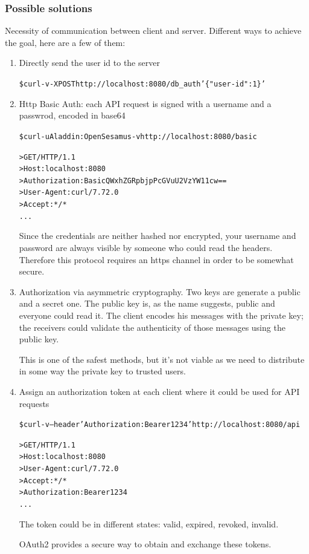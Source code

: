 \documentclass{style}
\begin{document}
\subsubsection{Possible solutions}
Necessity of communication between client and server.
Different ways to achieve the goal, here are a few of them:
\begin{enumerate}
    \item Directly send the user id to the server
    \begin{alltt}
\$ curl -v -X POST http://localhost:8080/db_auth '\{"user-id": 1\}'
    \end{alltt}

    \item Http Basic Auth: each API request is signed with a username and a passwrod, encoded in base64
    \begin{alltt}
\$ curl -u Aladdin:OpenSesamus -v http://localhost:8080/basic

> GET / HTTP/1.1
> Host: localhost:8080
> Authorization: Basic QWxhZGRpbjpPcGVuU2VzYW11cw==
> User-Agent: curl/7.72.0
> Accept: */*
...
    \end{alltt}
    Since the credentials are neither hashed nor encrypted, your username and password are always visible by
    someone who could read the headers.
    Therefore this protocol requires an https channel in order to be somewhat secure.

    \item Authorization via asymmetric cryptography. Two keys are generate a public and a secret one.
        The public key is, as the name suggests, public and everyone could read it.
        The client encodes his messages with the private key; the receivers could validate the authenticity of
        those messages using the public key.

        This is one of the safest methods, but it's not viable as we need to distribute in some way the private key to
        trusted users.

    \item Assign an authorization token at each client where it could be used for API requests
    \begin{alltt}
\$ curl -v --header 'Authorization: Bearer 1234' http://localhost:8080/api

> GET / HTTP/1.1
> Host: localhost:8080
> User-Agent: curl/7.72.0
> Accept: */*
> Authorization: Bearer 1234
...
    \end{alltt}
    The token could be in different states: valid, expired, revoked, invalid.

    OAuth2 provides a secure way to obtain and exchange these tokens.
\end{enumerate}
\end{document}
